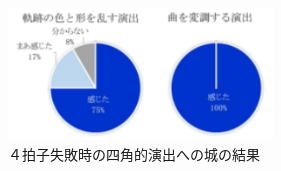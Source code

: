 \documentclass[uplatex]{jsarticle}   %
\begin{document}
\begin{figure}[H]
 \centering
 \includegraphics[clip,width=7cm]{miss.png}
 \caption{４拍子失敗時の四角的演出への城の結果}\label{fig:hoge}
\end{figure}




\end{document}
